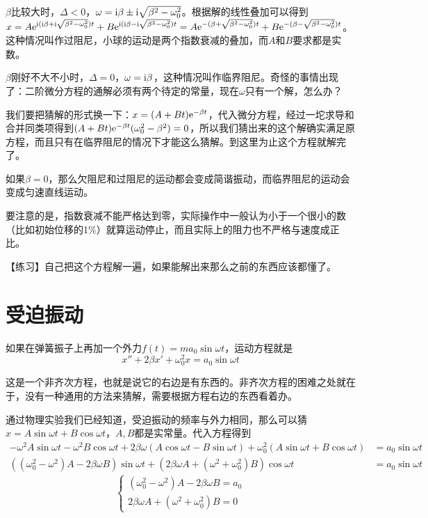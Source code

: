 $\beta$比较大时，$\Delta<0$，$\omega=\mathrm{i} \beta \pm \mathrm{i} \sqrt{\beta^2-\omega_0^2}$。根据解的线性叠加可以得到$x=A \mathrm{e}^{\mathrm{i} (\mathrm{i} \beta+\mathrm{i} \sqrt{\beta^2-\omega_0^2}) t}+B \mathrm{e}^{\mathrm{i} (\mathrm{i} \beta-\mathrm{i} \sqrt{\beta^2-\omega_0^2}) t}=A \mathrm{e}^{-(\beta+\sqrt{\beta^2-\omega_0^2})t}+B \mathrm{e}^{-(\beta-\sqrt{\beta^2-\omega_0^2})t}$。这种情况叫作过阻尼，小球的运动是两个指数衰减的叠加，而$A$和$B$要求都是实数。

$\beta$刚好不大不小时，$\Delta=0$，$\omega=\mathrm{i} \beta$，这种情况叫作临界阻尼。奇怪的事情出现了：二阶微分方程的通解必须有两个待定的常量，现在$\omega$只有一个解，怎么办？

我们要把猜解的形式换一下：$x=(A+B t)\mathrm{e}^{-\beta t}$，代入微分方程，经过一坨求导和合并同类项得到$(A+B t)\mathrm{e}^{-\beta t} (\omega_0^2-\beta^2)=0$，所以我们猜出来的这个解确实满足原方程，而且只有在临界阻尼的情况下才能这么猜解。到这里为止这个方程就解完了。

如果$\beta=0$，那么欠阻尼和过阻尼的运动都会变成简谐振动，而临界阻尼的运动会变成匀速直线运动。

要注意的是，指数衰减不能严格达到零，实际操作中一般认为小于一个很小的数（比如初始位移的1\%）就算运动停止，而且实际上的阻力也不严格与速度成正比。

【练习】自己把这个方程解一遍，如果能解出来那么之前的东西应该都懂了。
\section{受迫振动}
如果在弹簧振子上再加一个外力$f(t)=m a_0 \sin \omega t$，运动方程就是
\begin{equation*}
x''+2 \beta x'+\omega_0^2 x=a_0 \sin \omega t
\end{equation*}

这是一个非齐次方程，也就是说它的右边是有东西的。非齐次方程的困难之处就在于，没有一种通用的方法来猜解，需要根据方程右边的东西看着办。

通过物理实验我们已经知道，受迫振动的频率与外力相同，那么可以猜$x=A \sin \omega t+B \cos \omega t$，$A,B$都是实常量。代入方程得到
\begin{align*}
-\omega^2 A \sin \omega t-\omega^2 B \cos \omega t+2 \beta \omega (A \cos \omega t-B \sin \omega t)+\omega_0^2 (A \sin \omega t+B \cos \omega t)&=a_0 \sin \omega t \\
((\omega_0^2-\omega ^2)A-2 \beta \omega B)\sin \omega t +(2 \beta \omega A+(\omega ^2+\omega_0^2)B)\cos \omega t&=a_0 \sin \omega t
\end{align*}
\begin{equation*}
\begin{cases}
(\omega_0^2-\omega ^2)A-2 \beta \omega B=a_0 \\
2 \beta \omega A+(\omega ^2+\omega_0^2)B=0
\end{cases}
\end{equation*}

